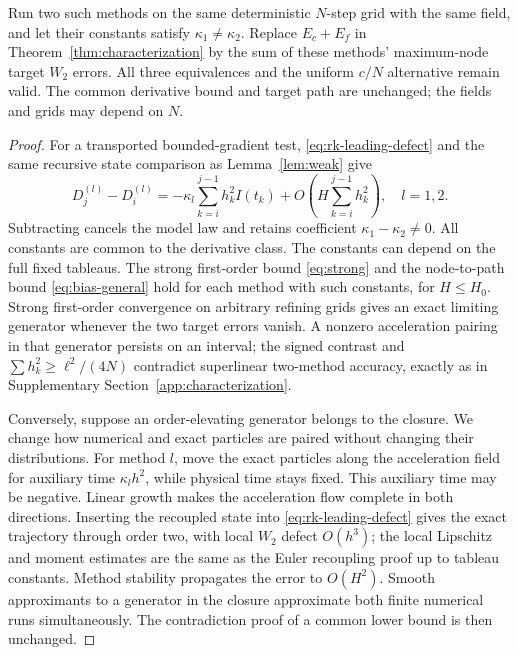 \begin{theorem}
\label{thm:rk-pair-proof}
Run two such methods on the same deterministic $N$-step grid with the same
field, and let their constants satisfy $\kappa_1\ne\kappa_2$.
Replace $E_c+E_f$ in Theorem~\ref{thm:characterization} by the sum of
these methods' maximum-node target $W_2$ errors. All three equivalences
and the uniform $c/N$ alternative remain valid. The common derivative bound and
target path are unchanged; the fields and grids may depend on $N$.
\end{theorem}
\begin{proof}
For a transported bounded-gradient test, \eqref{eq:rk-leading-defect}
and the same recursive state comparison as Lemma~\ref{lem:weak} give
\[
 D_j^{(l)}-D_i^{(l)}=-\kappa_l\sum_{k=i}^{j-1}h_k^2 I(t_k)
             +O\!\left(H\sum_{k=i}^{j-1}h_k^2\right),\quad l=1,2.
\]
Subtracting cancels the model law and retains coefficient
$\kappa_1-\kappa_2\ne0$. All constants are common to the derivative class.
The constants can depend on the full fixed tableaus.
The strong first-order bound \eqref{eq:strong} and the node-to-path bound
\eqref{eq:bias-general} hold for each method with such constants, for
$H\le H_0$.
Strong first-order convergence on arbitrary refining grids gives an exact
limiting generator whenever the two target errors vanish. A nonzero acceleration
pairing in that generator persists on an interval; the signed contrast and
$\sum h_k^2\ge\ell^2/(4N)$ contradict superlinear two-method accuracy,
exactly as in Supplementary Section~\ref{app:characterization}.

Conversely, suppose an order-elevating generator belongs to the closure.
We change how numerical and exact particles are paired without changing
their distributions. For method $l$, move the exact particles along the
acceleration field for auxiliary time $\kappa_l h^2$, while physical time
stays fixed. This auxiliary time may be negative. Linear growth makes the
acceleration flow complete in both directions. Inserting the recoupled state into
\eqref{eq:rk-leading-defect} gives the exact trajectory through order two,
with local $W_2$ defect $O(h^3)$; the local Lipschitz and moment estimates
are the same as the Euler recoupling proof up to tableau constants.
Method stability propagates the error to $O(H^2)$. Smooth approximants to
a generator in the closure approximate both finite numerical runs simultaneously.
The contradiction proof of a common lower bound is then unchanged.
\end{proof}

